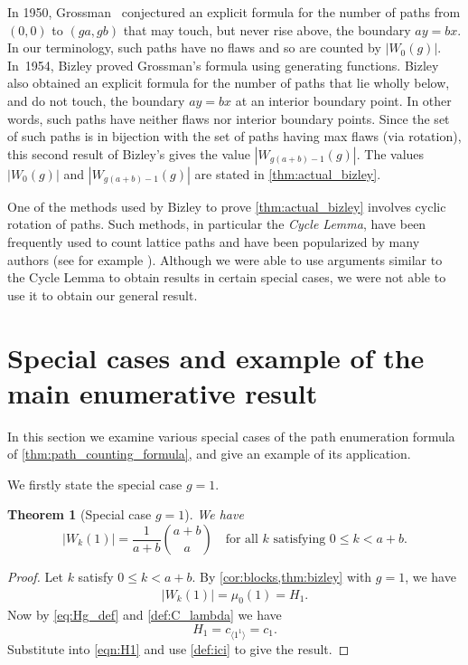 \documentclass[11pt]{article}
\newtheorem{thm}{Theorem}[section] %
\theoremstyle{definition} %
\numberwithin{equation}{section}
\begin{document}
In 1950, Grossman~\cite{grossman1950paths} conjectured an explicit formula for the number of paths from $(0,0)$ to $(ga,gb)$ 
that may touch, but never rise above, the boundary $ay = bx$.
In our terminology, such paths have no flaws and so are counted by $|W_0(g)|$.
In~1954, Bizley \cite[Eq.~(10)]{biz} proved Grossman's formula using generating functions. 
Bizley \cite[Eq.~(8)]{biz} also obtained an explicit formula for the number of paths 
that lie wholly below, and do not touch, the boundary $ay=bx$ at an interior boundary point.
In other words, such paths have neither flaws nor interior boundary points.
Since the set of such paths is in bijection with the set of paths having max flaws (via rotation), this second result of Bizley's gives the value $|W_{g(a+b)-1}(g)|$. The values $|W_0(g)|$ and $|W_{g(a+b)-1}(g)|$ are stated in \cref{thm:actual_bizley}. 

One of the methods used by Bizley to prove \cref{thm:actual_bizley} involves cyclic rotation of paths. Such methods, in particular the \textit{Cycle Lemma}, have been frequently used to count lattice paths and have been popularized by many authors (see for example \cite{cycle_lemma_applications,cycle_lemma_og}).  Although we were able to use arguments similar to the Cycle Lemma to obtain results in certain special cases, we were not able to use it to obtain our general result.


\section{Special cases and example of the main enumerative result}
In this section we examine various special cases of the path enumeration formula of \cref{thm:path_counting_formula}, and give an example of its application. 

We firstly state the special case $g=1$.

\begin{thm}[Special case $g=1$]
\label{thm:fir_mar_rat}
We have
    \begin{equation}
        |W_k(1)| = \frac{1}{a+b}\binom{a+b}{a}
       \quad
         \mbox{for all $k$ satisfying $0 \le k < a+b$}.
    \end{equation}
\end{thm}
\begin{proof}
Let $k$ satisfy $0 \le k < a+b$.
By \cref{cor:blocks,thm:bizley} with $g=1$, we have
\begin{align}
|W_k(1)| = \mu_0(1) =  H_1 \label{eqn:H1}.
\end{align}
Now by \eqref{eq:Hg_def} and \eqref{def:C_lambda} we have
\[
H_1 = c_{\langle 1^1 \rangle} = c_1.
\]
Substitute into \eqref{eqn:H1} and use \eqref{def:ici} to give the result.
\end{proof}
\end{document}
